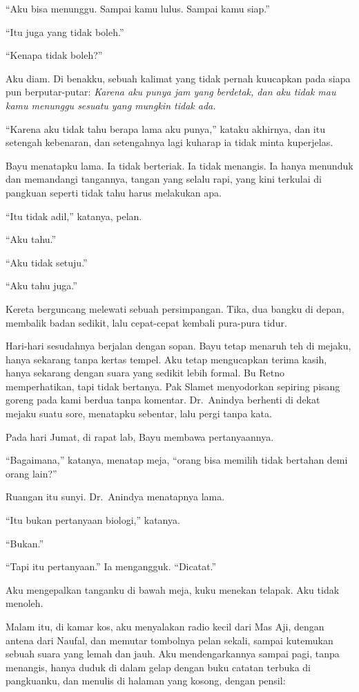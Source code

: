\documentclass[11pt,twoside,openany]{book}
\makeatletter
\newcommand{\scenebreak}{\par\vspace{0.9em}{\centering\textsc{*\hspace{0.7em}*\hspace{0.7em}*}\par}\vspace{0.9em}\@afterindentfalse\@afterheading}
\makeatother
\begin{document}
``Aku bisa menunggu. Sampai kamu lulus. Sampai kamu siap.''

``Itu juga yang tidak boleh.''

``Kenapa tidak boleh?''

Aku diam. Di benakku, sebuah kalimat yang tidak pernah kuucapkan pada siapa pun berputar-putar: \emph{Karena aku punya jam yang berdetak, dan aku tidak mau kamu menunggu sesuatu yang mungkin tidak ada.}

``Karena aku tidak tahu berapa lama aku punya,'' kataku akhirnya, dan itu setengah kebenaran, dan setengahnya lagi kuharap ia tidak minta kuperjelas.

Bayu menatapku lama. Ia tidak berteriak. Ia tidak menangis. Ia hanya menunduk dan memandangi tangannya, tangan yang selalu rapi, yang kini terkulai di pangkuan seperti tidak tahu harus melakukan apa.

``Itu tidak adil,'' katanya, pelan.

``Aku tahu.''

``Aku tidak setuju.''

``Aku tahu juga.''

Kereta berguncang melewati sebuah persimpangan. Tika, dua bangku di depan, membalik badan sedikit, lalu cepat-cepat kembali pura-pura tidur.

\scenebreak
Hari-hari sesudahnya berjalan dengan sopan. Bayu tetap menaruh teh di mejaku, hanya sekarang tanpa kertas tempel. Aku tetap mengucapkan terima kasih, hanya sekarang dengan suara yang sedikit lebih formal. Bu Retno memperhatikan, tapi tidak bertanya. Pak Slamet menyodorkan sepiring pisang goreng pada kami berdua tanpa komentar. Dr.~Anindya berhenti di dekat mejaku suatu sore, menatapku sebentar, lalu pergi tanpa kata.

Pada hari Jumat, di rapat lab, Bayu membawa pertanyaannya.

``Bagaimana,'' katanya, menatap meja, ``orang bisa memilih tidak bertahan demi orang lain?''

Ruangan itu sunyi. Dr.~Anindya menatapnya lama.

``Itu bukan pertanyaan biologi,'' katanya.

``Bukan.''

``Tapi itu pertanyaan.'' Ia mengangguk. ``Dicatat.''

Aku mengepalkan tanganku di bawah meja, kuku menekan telapak. Aku tidak menoleh.

Malam itu, di kamar kos, aku menyalakan radio kecil dari Mas Aji, dengan antena dari Naufal, dan memutar tombolnya pelan sekali, sampai kutemukan sebuah suara yang lemah dan jauh. Aku mendengarkannya sampai pagi, tanpa menangis, hanya duduk di dalam gelap dengan buku catatan terbuka di pangkuanku, dan menulis di halaman yang kosong, dengan pensil:
\end{document}
